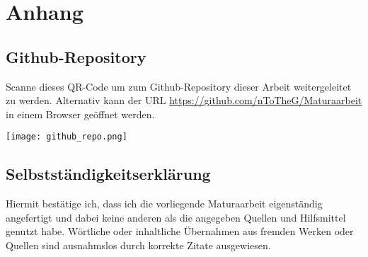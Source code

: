 \chapter*{Anhang}

\section*{Github-Repository}

Scanne dieses QR-Code um zum Github-Repository dieser Arbeit weitergeleitet zu werden. Alternativ kann der URL
\url{https://github.com/nToTheG/Maturaarbeit} in einem Browser geöffnet werden.

\begin{center}
    \begin{imgbox}
        \centering
        \texttt{[image: github\_repo.png]}
    \end{imgbox}
\end{center}

\section*{Selbstständigkeitserklärung}

Hiermit bestätige ich, dass ich die vorliegende Maturaarbeit eigenständig angefertigt und dabei keine anderen als die angegeben Quellen und Hilfsmittel genutzt habe. Wörtliche oder inhaltliche Übernahmen aus fremden Werken oder Quellen sind ausnahmslos durch korrekte Zitate ausgewiesen.